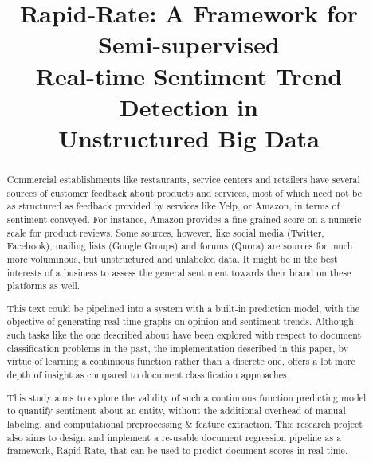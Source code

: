 \documentclass[conference]{IEEEtran}
\begin{document}
\title{Rapid-Rate: A Framework for Semi-supervised\\Real-time Sentiment Trend Detection in\\Unstructured Big Data}

\author{
}

\maketitle

\begin{abstract}
    Commercial establishments like restaurants, service centers and retailers have several sources of customer feedback about products and services, most of which need not be as structured as feedback provided by services like Yelp, or Amazon, in terms of sentiment conveyed.
    For instance, Amazon provides a fine-grained score on a numeric scale for product reviews.
    Some sources, however, like social media (Twitter, Facebook), mailing lists (Google Groups) and forums (Quora) are sources for much more voluminous, but unstructured and unlabeled data.
    It might be in the best interests of a business to assess the general sentiment towards their brand on these platforms as well. 
    
    This text could be pipelined into a system with a built-in prediction model, with the objective of generating real-time graphs on opinion and sentiment trends.
    Although such tasks like the one described about have been explored with respect to document classification problems in the past, the implementation described in this paper, by virtue of learning a continuous function rather than a discrete one, offers a lot more depth of insight as compared to document classification approaches. 
    
    This study aims to explore the validity of such a continuous function predicting model to quantify sentiment about an entity, without the additional overhead of manual labeling, and computational preprocessing \& feature extraction.
    This research project also aims to design and implement a re-usable document regression pipeline as a framework, Rapid-Rate, that can be used to predict document scores in real-time.
\end{abstract}
\end{document}
